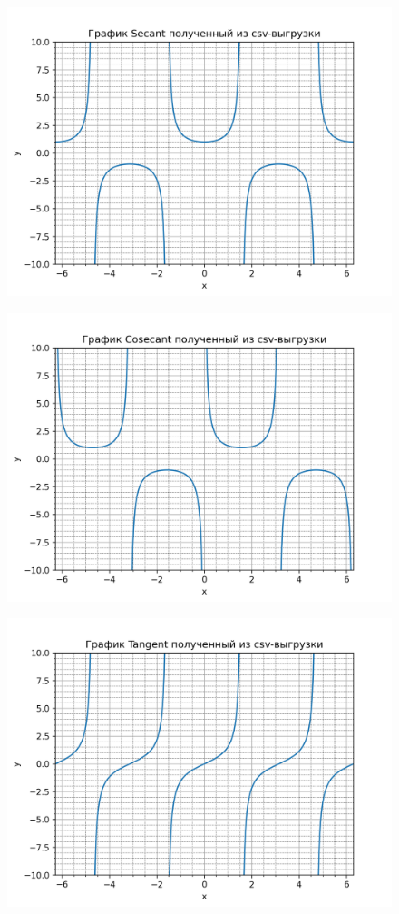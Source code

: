 \documentclass[12pt,onecolumn]{article}
\begin{document}
\begin{figure}[H]
    \centering
    \includegraphics[width=\textwidth]{image/Secant.png}
\end{figure}
\begin{figure}[H]
    \centering
    \includegraphics[width=\textwidth]{image/Cosecant.png}
\end{figure}
\begin{figure}[H]
    \centering
    \includegraphics[width=\textwidth]{image/Tangent.png}
\end{figure}
\end{document}
